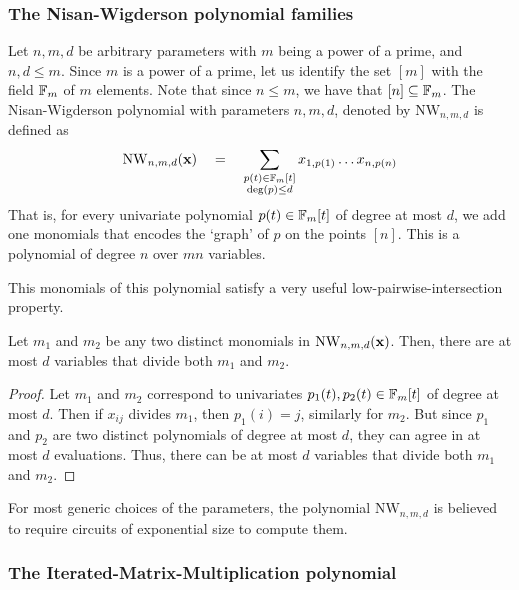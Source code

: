 \documentclass[12pt]{report}
\newcommand{\NW}{\mathrm{NW}}
\begin{document}
\subsubsection*{The Nisan-Wigderson polynomial families}

Let $n,m,d$ be arbitrary parameters with $m$ being a power of a prime, and $n,d\leq m$. Since $m$ is a power of a prime, let us identify the set $[m]$ with the field $\mathbb{F}_m$ of $m$ elements. Note that since $n \leq m$, we have that $[n] \subseteq \mathbb{F}_m$. The Nisan-Wigderson polynomial with parameters $n,m,d$, denoted by $\mathrm{NW}_{n,m,d}$ is defined as
\[
\NW_{n,m,d}(\vecx) \spaced{=} \sum_{\substack{p(t) \in \F_m[t]\\ \deg(p) \leq d}} x_{1,p(1)}\dots x_{n,p(n)}
\]
That is, for every univariate polynomial $p(t) \in \mathbb{F}_m[t]$ of degree at most $d$, we add one monomials that encodes the `graph' of $p$ on the points $[n]$. This is a polynomial of degree $n$ over $mn$ variables.

This monomials of this polynomial satisfy a very useful low-pairwise-intersection property. 

\begin{lemma}\label{lem:NW-low-intersection}
Let $m_1$ and $m_2$ be any two distinct monomials in $\NW_{n,m,d}(\vecx)$. Then, there are at most $d$ variables that divide both $m_1$ and $m_2$. 
\end{lemma}
\begin{proof}
Let $m_1$ and $m_2$ correspond to univariates $p_1(t), p_2(t) \in \mathbb{F}_m[t]$ of degree at most $d$. Then if $x_{ij}$ divides $m_1$, then $p_1(i) = j$, similarly for $m_2$. But since $p_1$ and $p_2$ are two distinct polynomials of degree at most $d$, they can agree in at most $d$ evaluations. Thus, there can be at most $d$ variables that divide both $m_1$ and $m_2$. 
\end{proof}

For most generic choices of the parameters, the polynomial $\NW_{n,m,d}$ is believed to require circuits of exponential size to compute them. 

\subsubsection*{The Iterated-Matrix-Multiplication polynomial}
\end{document}

